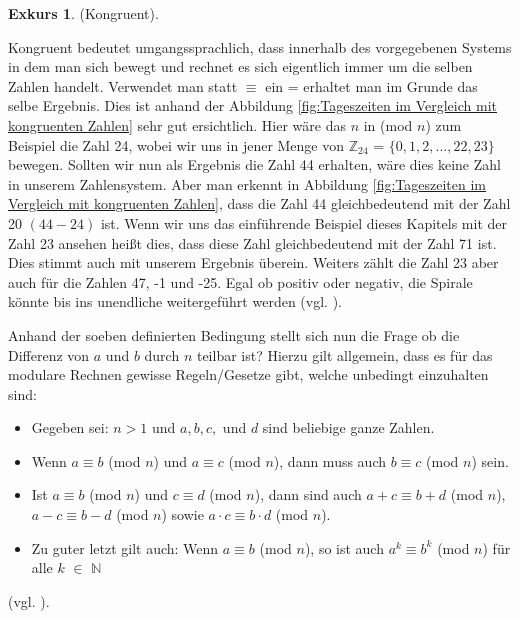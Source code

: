 \documentclass[12pt,a4paper]{article}
\theoremstyle{definition}
\newtheorem{exkurs}{Exkurs}
\begin{document}
\newpage
\begin{exkurs}(Kongruent).
\par\begingroup\leftskip=0.5cm\rightskip=0.5cm\noindent
Kongruent bedeutet umgangssprachlich, dass innerhalb des vorgegebenen Systems in dem man sich bewegt und rechnet es sich eigentlich immer um die selben Zahlen handelt.
Verwendet man statt $\equiv$ ein = erhaltet man im Grunde das selbe Ergebnis.
Dies ist anhand der Abbildung \ref{fig:Tageszeiten im Vergleich mit kongruenten Zahlen} sehr gut ersichtlich.
Hier wäre das $n$ in (mod $n$) zum Beispiel die Zahl 24, wobei wir uns in jener Menge von $\mathbb{Z}_{24}$ = $\{0, 1, 2, ..., 22, 23\}$ bewegen.
Sollten wir nun als Ergebnis die Zahl 44 erhalten, wäre dies keine Zahl in unserem Zahlensystem.
Aber man erkennt in Abbildung \ref{fig:Tageszeiten im Vergleich mit kongruenten Zahlen}, dass die Zahl 44 gleichbedeutend mit der Zahl 20 $(44-24)$ ist.
Wenn wir uns das einführende Beispiel dieses Kapitels mit der Zahl 23 ansehen heißt dies, dass diese Zahl gleichbedeutend mit der Zahl 71 ist.
Dies stimmt auch mit unserem Ergebnis überein.
Weiters zählt die Zahl 23 aber auch für die Zahlen 47, -1 und -25.
Egal ob positiv oder negativ, die Spirale könnte bis ins unendliche weitergeführt werden (vgl. \cite[298--299]{Meinel2011}).
\par
\endgroup
\end{exkurs}

Anhand der soeben definierten Bedingung stellt sich nun die Frage ob die Differenz von $a$ und $b$ durch $n$ teilbar ist?
Hierzu gilt allgemein, dass es für das modulare Rechnen gewisse Regeln/Gesetze gibt, welche unbedingt einzuhalten sind:
\begin{itemize}
    \item Gegeben sei: $n>1$ und $a, b, c,$ und $d$ sind beliebige ganze Zahlen.
    \item Wenn $a\equiv b$ (mod $n$) und $a\equiv c$ (mod $n$), dann muss auch $b\equiv c$ (mod $n$) sein.
    \item Ist $a\equiv b$ (mod $n$) und $c\equiv d$ (mod $n$), dann sind auch $a + c\equiv b + d$ (mod $n$), $a - c\equiv b - d$ (mod $n$) sowie $a \cdot c\equiv b \cdot d$ (mod $n$).
    \item Zu guter letzt gilt auch: Wenn $a\equiv b$ (mod $n$), so ist auch $a^k\equiv b^k$ (mod $n$) für alle $k$ $\in$ $\mathbb{N}$
\end{itemize}
(vgl. \cite[66]{RempeGillen2009}).
\end{document}
